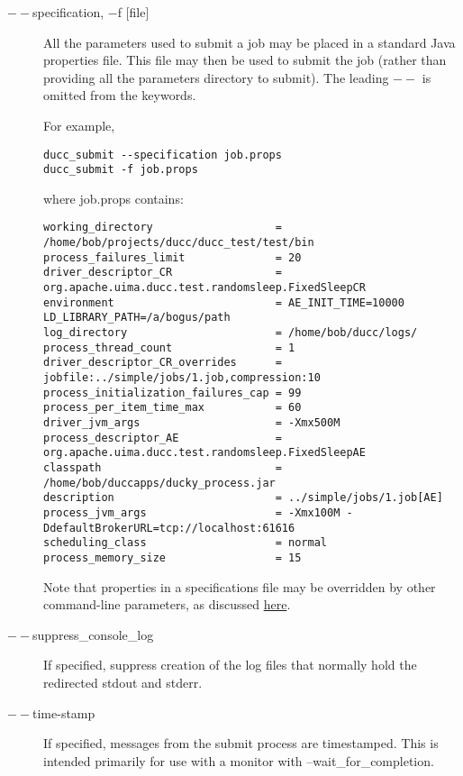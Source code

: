 \begin{description}
           \item[$--$specification, $-$f {[file]}  ]

             All the parameters used to submit a job may be placed in a standard Java properties file. 
             This file may then be used to submit the job (rather than providing all the parameters 
             directory to submit). The leading $--$ is omitted from the keywords.

             For example, 
\begin{verbatim}
ducc_submit --specification job.props 
ducc_submit -f job.props 
\end{verbatim}

             where job.props contains: 
\begin{verbatim}
working_directory                   = /home/bob/projects/ducc/ducc_test/test/bin 
process_failures_limit              = 20 
driver_descriptor_CR                = org.apache.uima.ducc.test.randomsleep.FixedSleepCR 
environment                         = AE_INIT_TIME=10000 LD_LIBRARY_PATH=/a/bogus/path 
log_directory                       = /home/bob/ducc/logs/ 
process_thread_count                = 1 
driver_descriptor_CR_overrides      = jobfile:../simple/jobs/1.job,compression:10 
process_initialization_failures_cap = 99 
process_per_item_time_max           = 60 
driver_jvm_args                     = -Xmx500M 
process_descriptor_AE               = org.apache.uima.ducc.test.randomsleep.FixedSleepAE 
classpath                           = /home/bob/duccapps/ducky_process.jar 
description                         = ../simple/jobs/1.job[AE] 
process_jvm_args                    = -Xmx100M -DdefaultBrokerURL=tcp://localhost:61616 
scheduling_class                    = normal 
process_memory_size                 = 15 
\end{verbatim}

             Note that properties in a specifications file may be overridden by other command-line
             parameters, as discussed \hyperref[chap:cli]{here}.

           \item[$--$suppress\_console\_log] If specified, suppress creation of the log files that 
             normally hold the redirected stdout and stderr.

           \item[$--$time-stamp ]

             If specified, messages from the submit process are timestamped. This is intended primarily 
             for use with a monitor with --wait\_for\_completion. 


\end{description}
